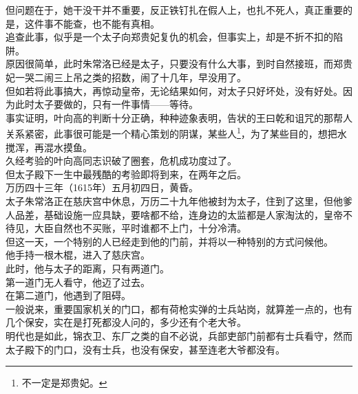 \begin{multicols}{\theparacolNo}
但问题在于，她干没干并不重要，反正铁钉扎在假人上，也扎不死人，真正重要的是，这件事不能查，也不能有真相。\\

追查此事，似乎是一个太子向郑贵妃复仇的机会，但事实上，却是不折不扣的陷阱。\\

原因很简单，此时朱常洛已经是太子，只要没有什么大事，到时自然接班，而郑贵妃一哭二闹三上吊之类的招数，闹了十几年，早没用了。\\

但如若将此事搞大，再惊动皇帝，无论结果如何，对太子只好坏处，没有好处。因为此时太子要做的，只有一件事情——等待。\\

事实证明，叶向高的判断十分正确，种种迹象表明，告状的王曰乾和诅咒的那帮人关系紧密，此事很可能是一个精心策划的阴谋，某些人\footnote{不一定是郑贵妃。}，为了某些目的，想把水搅浑，再混水摸鱼。\\

久经考验的叶向高同志识破了圈套，危机成功度过了。\\

但太子殿下一生中最残酷的考验即将到来，在两年之后。\\

万历四十三年（1615年）五月初四日，黄昏。\\

太子朱常洛正在慈庆宫中休息，万历二十九年他被封为太子，住到了这里，但他爹人品差，基础设施一应具缺，要啥都不给，连身边的太监都是人家淘汰的，皇帝不待见，大臣自然也不买账，平时谁都不上门，十分冷清。\\

但这一天，一个特别的人已经走到他的门前，并将以一种特别的方式问候他。\\

他手持一根木棍，进入了慈庆宫。\\

此时，他与太子的距离，只有两道门。\\

第一道门无人看守，他迈了过去。\\

在第二道门，他遇到了阻碍。\\

一般说来，重要国家机关的门口，都有荷枪实弹的士兵站岗，就算差一点的，也有几个保安，实在是打死都没人问的，多少还有个老大爷。\\

明代也是如此，锦衣卫、东厂之类的自不必说，兵部吏部门前都有士兵看守，然而太子殿下的门口，没有士兵，也没有保安，甚至连老大爷都没有。\\


\end{multicols}
